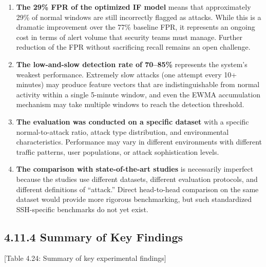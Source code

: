 \documentclass[
  a4paper]{report}
\begin{document}
\begin{enumerate}
\def\labelenumi{\arabic{enumi}.}
\item
  \textbf{The 29\% FPR of the optimized IF model} means that
  approximately 29\% of normal windows are still incorrectly flagged as
  attacks. While this is a dramatic improvement over the 77\% baseline
  FPR, it represents an ongoing cost in terms of alert volume that
  security teams must manage. Further reduction of the FPR without
  sacrificing recall remains an open challenge.
\item
  \textbf{The low-and-slow detection rate of 70--85\%} represents the
  system's weakest performance. Extremely slow attacks (one attempt
  every 10+ minutes) may produce feature vectors that are
  indistinguishable from normal activity within a single 5-minute
  window, and even the EWMA accumulation mechanism may take multiple
  windows to reach the detection threshold.
\item
  \textbf{The evaluation was conducted on a specific dataset} with a
  specific normal-to-attack ratio, attack type distribution, and
  environmental characteristics. Performance may vary in different
  environments with different traffic patterns, user populations, or
  attack sophistication levels.
\item
  \textbf{The comparison with state-of-the-art studies} is necessarily
  imperfect because the studies use different datasets, different
  evaluation protocols, and different definitions of ``attack.'' Direct
  head-to-head comparison on the same dataset would provide more
  rigorous benchmarking, but such standardized SSH-specific benchmarks
  do not yet exist.
\end{enumerate}

\subsection{4.11.4 Summary of Key
Findings}\label{summary-of-key-findings}

{[}Table 4.24: Summary of key experimental findings{]}
\end{document}
